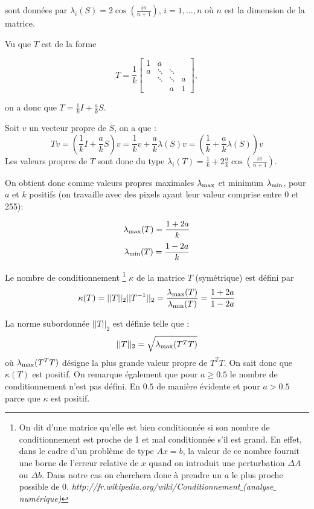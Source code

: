 sont données par $\lambda_i(S) = 2 \cos(\frac{i\pi}{n+1})$, $i= 1, \ldots , n$ où $n$ est la dimension de la matrice.

Vu que $T$ est de la forme

$$
 T = \frac{1}{k}
 \begin{bmatrix}
    1 & a 		& 			& \\
    a & \ddots 	& \ddots 	& \\
      & \ddots 	& \ddots 	& a \\
      & 		& a			& 1
  \end{bmatrix},
$$

on a donc que $T = \frac{1}{k} I + \frac{a}{k} S$.

Soit $v$ un vecteur propre de $S$, on a que :
\begin{equation}
T v = \left( \frac{1}{k} I + \frac{a}{k} S \right) v =
\frac{1}{k} v + \frac{a}{k} \lambda(S) v = \left(\frac{1}{k} + \frac{a}{k} \lambda(S)\right) v
\end{equation}
Les valeurs propres de $T$ sont donc du type $\lambda_i(T) = \frac{1}{k} + 2 \frac{a}{k} \cos(\frac{i\pi}{n+1})$.

On obtient donc comme valeurs propres maximales $\lambda_\mathrm{max}$ et minimum $\lambda_\mathrm{min}$,
pour $a$ et $k$ positifs (on travaille avec des pixels ayant leur valeur comprise entre 0 et 255):

$$\lambda_\mathrm{max} (T) =  \frac{1+2a}{k} $$
$$\lambda_\mathrm{min} (T) =  \frac{1-2a}{k} $$

Le nombre de conditionnement
\footnote{On dit d'une matrice qu'elle est bien conditionnée si son nombre de conditionnement
  est proche de 1 et mal conditionnée s'il est grand.
En effet, dans le cadre d'un problème de type $Ax = b$,
la valeur de ce nombre fournit une borne de l'erreur relative de $x$ quand on introduit une perturbation $\Delta A $ ou $\Delta b$.
Dans notre cas on cherchera donc à prendre un $a$ le plus proche possible de 0.
\textit{http://fr.wikipedia.org/wiki/Conditionnement$\_$(analyse$\_$numérique)}}
 $\kappa$ de la matrice $T$ (symétrique) est défini par
\begin{equation}
	\kappa (T) = ||T||_2||T^{-1}||_2 = \frac{\lambda_\mathrm{max} (T)}{\lambda_\mathrm{min} (T)} = \frac{1+2a}{1-2a}
\end{equation}

La norme subordonnée $||T||_2$ est définie telle que :
$$||T||_2 = \sqrt{\lambda_\mathrm{max}(T^TT)}$$
où $\lambda_\mathrm{max}(T^TT)$ désigne la plus grande valeur propre de $T^TT$.
On sait donc que $\kappa(T) $ est positif.
On remarque également que pour $a \geq 0.5$ le nombre de conditionnement n'est pas défini.
En $0.5$ de manière évidente et pour $a > 0.5$ parce que $\kappa$ est positif.

